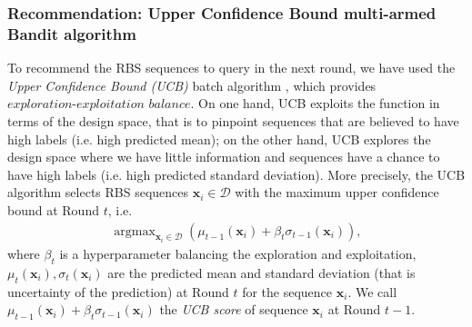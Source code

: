 \documentclass{scrartcl}[2013/05/29]%
\begin{document}

\subsubsection{Recommendation: Upper Confidence Bound multi-armed Bandit algorithm}

To recommend the RBS sequences to query in the next round, we have used the \textit{Upper Confidence Bound (UCB)} batch algorithm
\cite{lattimore2020bandit}
, which provides  $\textit{exploration-exploitation balance}$.
On one hand, UCB exploits the function in terms of the design space, that is to pinpoint sequences that are believed to have high labels (i.e. high predicted mean); 
on the other hand, UCB explores the design space where we have little information and sequences have a chance to have high labels (i.e. high predicted standard deviation).
More precisely, the UCB algorithm selects RBS sequences $\mathbf{x}_i \in \mathcal{D}$ with the maximum upper confidence bound at Round $t$, i.e.
\begin{align}
\label{Eq: GPUCB}
    \operatorname{argmax}_{\mathbf{x}_i \in \mathcal{D}} \left( \mu_{t-1}(\mathbf{x}_i) + \beta_t \sigma_{t-1}(\mathbf{x}_i)\right),
\end{align}
where $\beta_t$ is a hyperparameter balancing the exploration and exploitation, 
$\mu_t(\mathbf{x}_i), \sigma_t(\mathbf{x}_i)$ are the predicted mean and standard deviation (that is uncertainty of the prediction) at Round $t$ for the sequence $\mathbf{x}_i$.
We call $\mu_{t-1}(\mathbf{x}_i) + \beta_t \sigma_{t-1}(\mathbf{x}_i)$ the \textit{UCB score} of sequence $\mathbf{x}_i$ at Round $t-1$.\\
\end{document}
